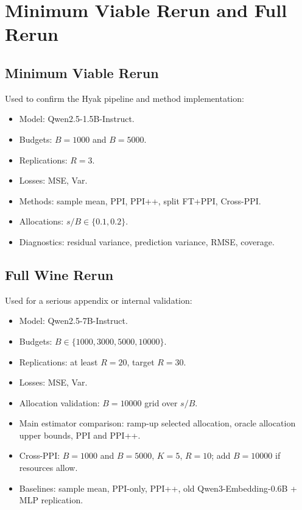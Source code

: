 \documentclass[11pt]{article}
\begin{document}
\section{Minimum Viable Rerun and Full Rerun}

\subsection{Minimum Viable Rerun}

Used to confirm the Hyak pipeline and method implementation:

\begin{itemize}
    \item Model: Qwen2.5-1.5B-Instruct.
    \item Budgets: $B=1000$ and $B=5000$.
    \item Replications: $R=3$.
    \item Losses: MSE, Var.
    \item Methods: sample mean, PPI, PPI++, split FT+PPI, Cross-PPI.
    \item Allocations: $s/B\in\{0.1,0.2\}$.
    \item Diagnostics: residual variance, prediction variance, RMSE, coverage.
\end{itemize}

\subsection{Full Wine Rerun}

Used for a serious appendix or internal validation:

\begin{itemize}
    \item Model: Qwen2.5-7B-Instruct.
    \item Budgets: $B\in\{1000,3000,5000,10000\}$.
    \item Replications: at least $R=20$, target $R=30$.
    \item Losses: MSE, Var.
    \item Allocation validation: $B=10000$ grid over $s/B$.
    \item Main estimator comparison: ramp-up selected allocation, oracle allocation upper bounds, PPI and PPI++.
    \item Cross-PPI: $B=1000$ and $B=5000$, $K=5$, $R=10$; add $B=10000$ if resources allow.
    \item Baselines: sample mean, PPI-only, PPI++, old Qwen3-Embedding-0.6B + MLP replication.
\end{itemize}
\end{document}
